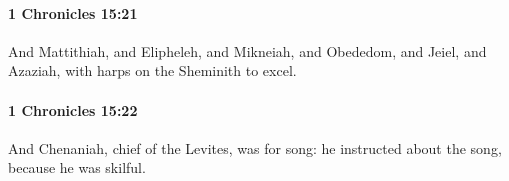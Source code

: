 		\paragraph{1 Chronicles 15:21} %
			\label{1CHRONICLES-15-21}

			And Mattithiah, and Elipheleh, and Mikneiah, and Obededom, and Jeiel, and Azaziah, with harps on the Sheminith to excel.


		\paragraph{1 Chronicles 15:22} %
			\label{1CHRONICLES-15-22}

			And Chenaniah, chief of the Levites, was for song: he instructed about the song, because he was skilful.


